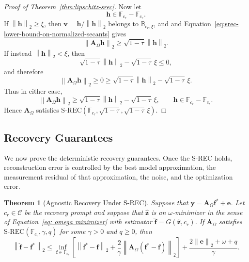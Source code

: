 \documentclass{article}
\theoremstyle{plain}
\newtheorem{theorem}{Theorem}[section]
\theoremstyle{definition}
\theoremstyle{remark}
\begin{document}
\begin{proof}[Proof of Theorem~\ref{thm:lipschitz-srec}]
  Now let
  \[
    \mathbf h\in\mathbb F_{c_r}-\mathbb F_{c_r}.
  \]
  If $\left\|\mathbf h\right\|_2\geq\xi$, then
  $\mathbf v=\mathbf h/\left\|\mathbf h\right\|_2$ belongs to
  $\mathbb B_{c_r,\xi}$, and and Equation~\eqref{eq:srec-lower-bound-on-normalized-secants} gives
  \[
    \left\|\mathbf A_\Omega\mathbf h\right\|_2
    \geq
    \sqrt{1-\tau}\left\|\mathbf h\right\|_2.
  \]
  If instead $\left\|\mathbf h\right\|_2<\xi$, then
  \[
    \sqrt{1-\tau}\left\|\mathbf h\right\|_2
    -
    \sqrt{1-\tau}\,\xi
    \leq
    0,
  \]
  and therefore
  \[
    \left\|\mathbf A_\Omega\mathbf h\right\|_2
    \geq
    0
    \geq
    \sqrt{1-\tau}\left\|\mathbf h\right\|_2
    -
    \sqrt{1-\tau}\,\xi.
  \]
  Thus in either case,
  \[
    \left\|\mathbf A_\Omega\mathbf h\right\|_2
    \geq
    \sqrt{1-\tau}\left\|\mathbf h\right\|_2
    -
    \sqrt{1-\tau}\,\xi,
    \qquad
    \mathbf h\in\mathbb F_{c_r}-\mathbb F_{c_r}.
  \]
  Hence $\mathbf A_\Omega$ satisfies
  $
    \mathrm{S\text{-}REC}
    \left(
      \mathbb F_{c_r},
      \sqrt{1-\tau},
      \sqrt{1-\tau}\,\xi
    \right).
  $
\end{proof}

\subsection{Recovery Guarantees}\label{app:agnostic-recovery}
We now prove the deterministic recovery guarantees. Once the S-REC holds, reconstruction error is controlled by the best model approximation, the measurement residual of that approximation, the noise, and the optimization error. 

\begin{theorem}[Agnostic Recovery Under S-REC]
  \label{thm:agnostic-recovery-srec}
  Suppose that $\mathbf y=\mathbf A_\Omega\mathbf f^*+\mathbf e$. Let $c_r\in\mathcal C$ be the recovery prompt and suppose that
  $\widehat{\mathbf z}$ is an  $\omega$-minimizer in the sense of Equation~\eqref{eq: omega minimizer} with estimator $\widehat{\mathbf f}=G(\widehat{\mathbf z},c_r)$.
  If $\mathbf A_\Omega$ satisfies
  $\mathrm{S\text{-}REC}(\mathbb F_{c_r},\gamma,q)$
  for some $\gamma>0$ and $q\geq 0$, then
  \[
    \left\|\widehat{\mathbf f}-\mathbf f^*\right\|_2
    \leq
    \inf_{\mathbf f\in\mathbb F_{c_r}}
    \left[
      \left\|\mathbf f^*-\mathbf f\right\|_2
      +
      \frac{2}{\gamma}
      \left\|\mathbf A_\Omega\left(\mathbf f^*-\mathbf f\right)\right\|_2
    \right]
    +
    \frac{2\left\|\mathbf e\right\|_2+\omega+q}{\gamma}.
  \]
\end{theorem}
\end{document}
